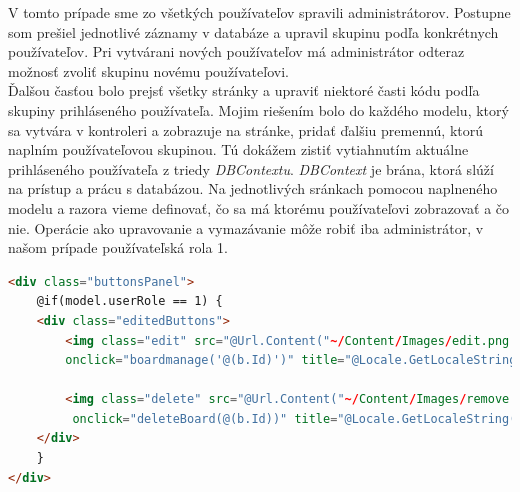 \documentclass[11pt, oneside]{report}
\begin{document}
V tomto prípade sme zo všetkých používateľov spravili administrátorov. Postupne som prešiel jednotlivé záznamy v databáze a upravil skupinu podľa konkrétnych používateľov. Pri vytvárani nových používateľov má administrátor odteraz možnosť zvoliť skupinu novému používateľovi.\\ Ďalšou časťou bolo prejsť všetky stránky a upraviť  niektoré časti kódu podľa skupiny prihláseného používateľa. Mojim riešením bolo do každého modelu, ktorý sa vytvára v kontroleri a zobrazuje na stránke, pridať ďalšiu premennú, ktorú naplním používateľovou skupinou. Tú dokážem zistiť vytiahnutím aktuálne prihláseného používateľa z triedy \textit{DBContextu}. \textit{DBContext} je brána, ktorá slúží na prístup a prácu s databázou. Na jednotlivých sránkach pomocou naplneného modelu  a razora vieme definovať, čo sa má ktorému používateľovi zobrazovať a čo nie. Operácie ako upravovanie a vymazávanie môže robiť iba administrátor, v našom prípade používateľská rola 1. 
\begin{lstlisting}[language=html,caption=Zobrazenie operácii pre administrátora,captionpos=b]
<div class="buttonsPanel">
    @if(model.userRole == 1) {
    <div class="editedButtons">
        <img class="edit" src="@Url.Content("~/Content/Images/edit.png ")"
        onclick="boardmanage('@(b.Id)')" title="@Locale.GetLocaleString("edit")" />
        
        <img class="delete" src="@Url.Content("~/Content/Images/remove.png")"
         onclick="deleteBoard(@(b.Id))" title="@Locale.GetLocaleString("delete")"/>
    </div>
    }
</div>
\end{lstlisting}
\end{document}
